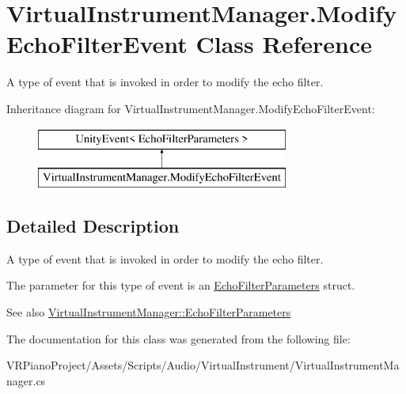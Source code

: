 \hypertarget{class_virtual_instrument_manager_1_1_modify_echo_filter_event}{}\section{Virtual\+Instrument\+Manager.\+Modify\+Echo\+Filter\+Event Class Reference}
\label{class_virtual_instrument_manager_1_1_modify_echo_filter_event}


A type of event that is invoked in order to modify the echo filter.  


Inheritance diagram for Virtual\+Instrument\+Manager.\+Modify\+Echo\+Filter\+Event\+:\begin{figure}[H]
\begin{center}
\leavevmode
\includegraphics[height=2.000000cm]{class_virtual_instrument_manager_1_1_modify_echo_filter_event}
\end{center}
\end{figure}


\subsection{Detailed Description}
A type of event that is invoked in order to modify the echo filter. 

The parameter for this type of event is an \hyperlink{class_virtual_instrument_manager_struct_virtual_instrument_manager_1_1_echo_filter_parameters}{Echo\+Filter\+Parameters} struct.

\begin{DoxySeeAlso}{See also}
\hyperlink{class_virtual_instrument_manager_struct_virtual_instrument_manager_1_1_echo_filter_parameters}{Virtual\+Instrument\+Manager\+::\+Echo\+Filter\+Parameters} 
\end{DoxySeeAlso}


The documentation for this class was generated from the following file\+:\begin{DoxyCompactItemize}
\item 
V\+R\+Piano\+Project/\+Assets/\+Scripts/\+Audio/\+Virtual\+Instrument/Virtual\+Instrument\+Manager.\+cs\end{DoxyCompactItemize}
